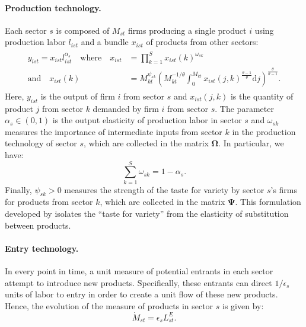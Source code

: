\documentclass[12pt]{article}
\begin{document}
\paragraph{Production technology.} Each sector $s$ is composed of $M_{st}$ firms producing a single product $i$ using production labor $l_{ist}$ and a bundle $x_{ist}$ of products from other sectors:
\begin{align}
    \begin{split}
    y_{ist} = x_{ist} l_{ist}^{\alpha_s} \quad \text{where} \quad x_{ist} &= \prod_{k = 1}^S x_{ist}(k)^{\omega_{sk}} \\
    \text{and} \quad x_{ist}(k) &= M_{kt}^{\psi_{sk}} \left(M_{kt}^{-1 / \theta} \int_0^{M_{kt}} x_{ist}(j, k)^{\frac{\theta - 1}{\theta}} \mathrm{d}j\right)^{\frac{\theta}{\theta - 1}}. \label{eq:production technology}
    \end{split}
\end{align}
Here, $y_{ist}$ is the output of firm $i$ from sector $s$ and $x_{ist}(j, k)$ is the quantity of product $j$ from sector $k$ demanded by firm $i$ from sector $s$. The parameter $\alpha_s \in (0, 1)$ is the output elasticity of production labor in sector $s$ and $\omega_{sk}$ measures the importance of intermediate inputs from sector $k$ in the production technology of sector $s$, which are collected in the matrix $\bm{\Omega}$. In particular, we have:
\begin{equation*}
    \sum_{k = 1}^S \omega_{sk} = 1 - \alpha_s.
\end{equation*}
Finally, $\psi_{sk} > 0$ measures the strength of the taste for variety by sector $s$'s firms for products from sector $k$, which are collected in the matrix $\bm{\Psi}$. This formulation developed by \citet{Benassy_1996} isolates the ``taste for variety'' from the elasticity of substitution between products.

\paragraph{Entry technology.} In every point in time, a unit measure of potential entrants in each sector attempt to introduce new products. Specifically, these entrants can direct $1 / \epsilon_s$ units of labor to entry in order to create a unit flow of these new products. Hence, the evolution of the measure of products in sector $s$ is given by:
\begin{equation}
    \dot{M}_{st} = \epsilon_s L_{st}^E. \label{eq:entry technology}
\end{equation}
\end{document}
